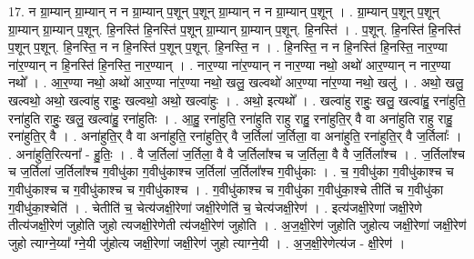 \documentclass[17pt]{extarticle}
\begin{document}
17. न ग्रा॒म्यान् ग्रा॒म्यान् न न ग्रा॒म्यान् प॒शून् प॒शून् ग्रा॒म्यान् न न ग्रा॒म्यान् प॒शून् । . ग्रा॒म्यान् प॒शून् प॒शून् ग्रा॒म्यान् ग्रा॒म्यान् प॒शून्. हि॒नस्ति॑ हि॒नस्ति॑ प॒शून् ग्रा॒म्यान् ग्रा॒म्यान् प॒शून्. हि॒नस्ति॑ । . प॒शून्. हि॒नस्ति॑ हि॒नस्ति॑ प॒शून् प॒शून्. हि॒नस्ति॒ न न हि॒नस्ति॑ प॒शून् प॒शून्. हि॒नस्ति॒ न । . हि॒नस्ति॒ न न हि॒नस्ति॑ हि॒नस्ति॒ नार॒ण्या ना॑र॒ण्यान् न हि॒नस्ति॑ हि॒नस्ति॒ नार॒ण्यान् । . नार॒ण्या ना॑र॒ण्यान् न नार॒ण्या नथो॒ अथो॑ आर॒ण्यान् न नार॒ण्या नथो᳚ । . आ॒र॒ण्या नथो॒ अथो॑ आर॒ण्या ना॑र॒ण्या नथो॒ खलु॒ खल्वथो॑ आर॒ण्या ना॑र॒ण्या नथो॒ खलु॑ । . अथो॒ खलु॒ खल्वथो॒ अथो॒ खल्वा॑हु राहुः॒ खल्वथो॒ अथो॒ खल्वा॑हुः । . अथो॒ इत्यथो᳚ । . खल्वा॑हु राहुः॒ खलु॒ खल्वा॑हु॒ रना॑हुति॒ रना॑हुति राहुः॒ खलु॒ खल्वा॑हु॒ रना॑हुतिः । . आ॒हु॒ रना॑हुति॒ रना॑हुति राहु राहु॒ रना॑हुति॒र् वै वा अना॑हुति राहु राहु॒ रना॑हुति॒र् वै । . अना॑हुति॒र् वै वा अना॑हुति॒ रना॑हुति॒र् वै ज॒र्तिला॑ ज॒र्तिला॒ वा अना॑हुति॒ रना॑हुति॒र् वै ज॒र्तिलाः᳚ । . अना॑हुति॒रित्यना᳚ - हु॒तिः॒ । . वै ज॒र्तिला॑ ज॒र्तिला॒ वै वै ज॒र्तिला᳚श्च च ज॒र्तिला॒ वै वै ज॒र्तिला᳚श्च । . ज॒र्तिला᳚श्च च ज॒र्तिला॑ ज॒र्तिला᳚श्च ग॒वीधु॑का ग॒वीधु॑काश्च ज॒र्तिला॑ ज॒र्तिला᳚श्च ग॒वीधु॑काः । . च॒ ग॒वीधु॑का ग॒वीधु॑काश्च च ग॒वीधु॑काश्च च ग॒वीधु॑काश्च च ग॒वीधु॑काश्च । . ग॒वीधु॑काश्च च ग॒वीधु॑का ग॒वीधु॑का॒श्चे तीति॑ च ग॒वीधु॑का ग॒वीधु॑का॒श्चेति॑ । . चेतीति॑ च॒ चेत्य॑जक्षी॒रेणा॑ जक्षी॒रेणेति॑ च॒ चेत्य॑जक्षी॒रेण॑ । . इत्य॑जक्षी॒रेणा॑ जक्षी॒रेणे तीत्य॑जक्षी॒रेण॑ जुहोति जुहो त्यजक्षी॒रेणेती त्य॑जक्षी॒रेण॑ जुहोति । . अ॒ज॒क्षी॒रेण॑ जुहोति जुहोत्य जक्षी॒रेणा॑ जक्षी॒रेण॑ जुहो त्याग्ने॒य्या᳚ ग्ने॒यी जु॑होत्य जक्षी॒रेणा॑ जक्षी॒रेण॑ जुहो त्याग्ने॒यी । . अ॒ज॒क्षी॒रेणेत्य॑ज - क्षी॒रेण॑ । \newline
\end{document}

